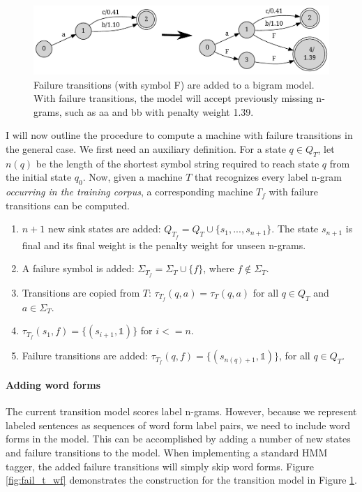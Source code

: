\begin{figure}
\begin{center}
\includegraphics[scale=0.5]{fail_t}
\caption{Failure transitions (with symbol F) are added to a bigram model. With failure transitions, the model will accept previously missing n-grams, such as aa and bb with penalty weight 1.39.}\label{fig:fail_t}
\end{center}
\end{figure}

I will now outline the procedure to compute a machine with failure
transitions in the general case. We first need an auxiliary
definition. For a state $q \in Q_T$, let $n(q)$ be the length of the
shortest symbol string required to reach state $q$ from the initial
state $q_0$.  Now, given a machine $T$ that recognizes every label
n-gram {\it occurring in the training corpus}, a corresponding machine $T_f$
with failure transitions can be computed.

\begin{enumerate}
\item $n+1$ new sink states are added: $Q_{T_f} = Q_T \cup \{s_1, ...,
  s_{n+1}\}$. The state $s_{n+1}$ is final and its final weight is the
  penalty weight for unseen n-grams.
\item A failure symbol is added: $\Sigma_{T_f} = \Sigma_T \cup \{f\}$, where $f \notin \Sigma_T$.
\item Transitions are copied from $T$: $\tau_{T_f}(q,a) = \tau_T(q,a)$ for all $q \in Q_T$ and $a \in \Sigma_T$. 
\item $\tau_{T_f}(s_1,f) = \{(s_{i+1}, \mathbb{1})\}$ for $i <= n$.
\item Failure transitions are added: $\tau_{T_f}(q, f) = \{(s_{n(q)+1}, \mathbb{1})\}$, for all $q \in Q_T$.
\end{enumerate}

\paragraph{Adding word forms} The current transition model scores
label n-grams. However, because we represent labeled sentences as
sequences of word form label pairs, we need to include word forms in
the model. This can be accomplished by adding a number of new states
and failure transitions to the model. When implementing a standard HMM
tagger, the added failure transitions will simply skip word
forms. Figure \ref{fig:fail_t_wf} demonstrates the construction for
the transition model in Figure \ref{fig:fail_t}.

